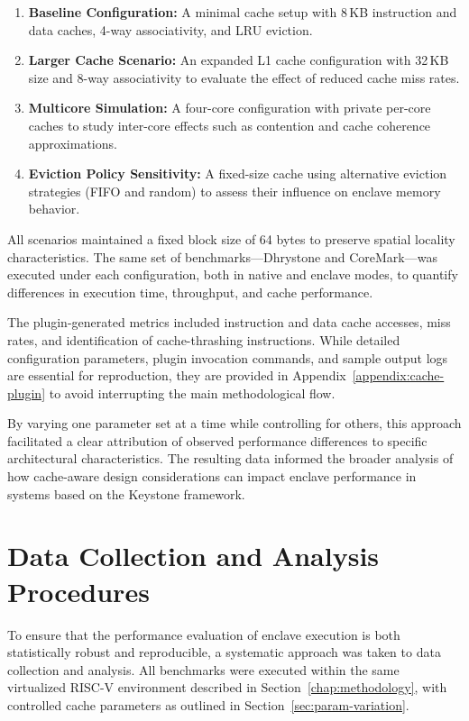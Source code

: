 \begin{enumerate}
    \item \textbf{Baseline Configuration:} A minimal cache setup with 8\,KB instruction and data caches, 4-way associativity, and LRU eviction.
    \item \textbf{Larger Cache Scenario:} An expanded L1 cache configuration with 32\,KB size and 8-way associativity to evaluate the effect of reduced cache miss rates.
    \item \textbf{Multicore Simulation:} A four-core configuration with private per-core caches to study inter-core effects such as contention and cache coherence approximations.
    \item \textbf{Eviction Policy Sensitivity:} A fixed-size cache using alternative eviction strategies (FIFO and random) to assess their influence on enclave memory behavior.
\end{enumerate}

All scenarios maintained a fixed block size of 64 bytes to preserve spatial locality characteristics. The same set of benchmarks—Dhrystone and CoreMark—was executed under each configuration, both in native and enclave modes, to quantify differences in execution time, throughput, and cache performance.

The plugin-generated metrics included instruction and data cache accesses, miss rates, and identification of cache-thrashing instructions. While detailed configuration parameters, plugin invocation commands, and sample output logs are essential for reproduction, they are provided in Appendix~\ref{appendix:cache-plugin} to avoid interrupting the main methodological flow.

By varying one parameter set at a time while controlling for others, this approach facilitated a clear attribution of observed performance differences to specific architectural characteristics. The resulting data informed the broader analysis of how cache-aware design considerations can impact enclave performance in systems based on the Keystone framework.

\section{Data Collection and Analysis Procedures}
\label{sec:data-collection}

To ensure that the performance evaluation of enclave execution is both statistically robust and reproducible, a systematic approach was taken to data collection and analysis. All benchmarks were executed within the same virtualized RISC-V environment described in Section~\ref{chap:methodology}, with controlled cache parameters as outlined in Section~\ref{sec:param-variation}.

